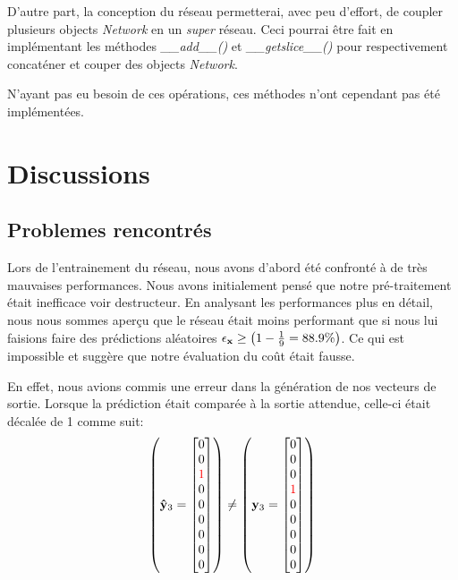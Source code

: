 \documentclass[11pt]{article}
\begin{document}
D'autre part, la conception du r\'eseau permetterai, avec peu d'effort, de coupler
plusieurs objects {\em Network} en un {\em super} r\'eseau.
Ceci pourrai \^etre fait en impl\'ementant les m\'ethodes {\em \_\_add\_\_()}
et {\em \_\_getslice\_\_()} pour respectivement concat\'ener et couper des objects
{\em Network}.

N'ayant pas eu besoin de ces op\'erations, ces m\'ethodes n'ont
cependant pas \'et\'e impl\'ement\'ees.





\section{Discussions}
\subsection{Problemes rencontr\'es}
Lors de l'entrainement du r\'eseau, nous avons d'abord \'et\'e confront\'e \`a
de tr\`es mauvaises performances. Nous avons initialement pens\'e que notre
pr\'e-traitement \'etait inefficace voir destructeur. En analysant les
performances plus en d\'etail,
nous nous sommes aper\c cu que le r\'eseau \'etait moins performant que si
nous lui faisions faire des pr\'edictions al\'eatoires
$\epsilon_{\bf x} \ge \left (1 - \frac{1}{9} = 88.9\% \right)$.
Ce qui est impossible et sugg\`ere que notre \'evaluation du co\^ut \'etait fausse.

En effet, nous avions commis une erreur dans la g\'en\'eration de nos vecteurs de
sortie. Lorsque la pr\'ediction \'etait compar\'ee \`a la sortie attendue,
celle-ci \'etait d\'ecal\'ee de 1 comme suit:
\begin{equation}
	\left (
	{\bf \hat y}_3 =
	\begin{bmatrix}
		0 \\
		0 \\
		{\color{red} 1 }\\
		0 \\
		0 \\
		0 \\
		0 \\
		0 \\
		0 \\
	\end{bmatrix}
	\right )
	\ne
	\left (
	{\bf y}_3 =
	\begin{bmatrix}
		0 \\
		0 \\
		0 \\
		{\color{red} 1 }\\
		0 \\
		0 \\
		0 \\
		0 \\
		0 \\
	\end{bmatrix}
	\right )
\end{equation}
\end{document}
